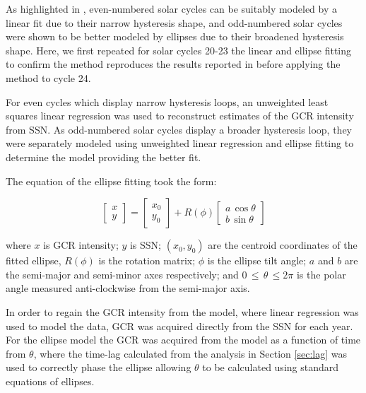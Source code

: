 As highlighted in \citet{inceoglu_modeling_2014}, even-numbered solar cycles can be suitably modeled by a linear fit due to their narrow hysteresis shape, and odd-numbered solar cycles were shown to be better modeled by ellipses due to their broadened hysteresis shape. Here, we first repeated for solar cycles 20-23 the linear and ellipse fitting to confirm the method reproduces the results reported in \citet{inceoglu_modeling_2014} before applying the method to cycle 24.

For even cycles which display narrow hysteresis loops, an unweighted least squares linear regression was used to reconstruct estimates of the GCR intensity from SSN. As odd-numbered solar cycles display a broader hysteresis loop, they were separately modeled using unweighted linear regression and ellipse fitting to determine the model providing the better fit. 

The equation of the ellipse fitting took the form:

\begin{equation}
\left[ \begin{array}{c} x \\ y \end{array} 	\right] = 
\left[ \begin{array}{c} x_0 \\ y_0 \end{array} \right] + 
R(\phi)
\left[ \begin{array}{c} a \, \cos{\theta} \\ b \, \sin{\theta} \end{array} \right]
\label{eq:ellipse}
\end{equation}

where $x$ is GCR intensity; $y$ is SSN; $(x_0, y_0)$ are the centroid coordinates of the fitted ellipse, $R(\phi)$ is the rotation matrix; $\phi$ is the ellipse tilt angle; $a$ and $b$ are the semi-major and semi-minor axes respectively; and $0 \, \leq \, \theta \, \leq 2\pi$ is the polar angle measured anti-clockwise from the semi-major axis.

In order to regain the GCR intensity from the model, where linear regression was used to model the data, GCR was acquired directly from the SSN for each year. For the ellipse model the GCR was acquired from the model as a function of time from $\theta$, where the time-lag calculated from the analysis in Section \ref{sec:lag} was used to correctly phase the ellipse allowing $\theta$ to be calculated using standard equations of ellipses.

